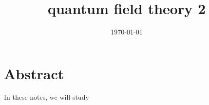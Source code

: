 \documentclass[a4paper, 12pt]{memoir}
\title{quantum field theory 2}
\date{\today}
\begin{document}
\frontmatter



\tableofcontents

\mainmatter



\chapter*{Abstract}

    In these notes, we will study
    



\backmatter

\clearpage
{}
\printbibliography
\end{document}
